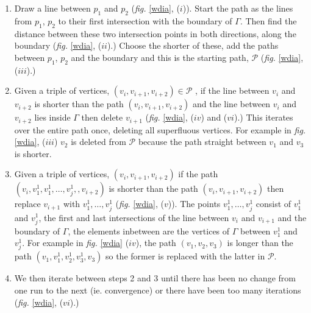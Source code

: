 \documentclass[a4paper,10pt]{article}
\newcommand{\fig}[1]{\emph{fig.} \ref{#1}}
\begin{document}
\begin{enumerate}
\item Draw a line between $p_1$ and $p_2$ (\fig{wdia}, ($i$)). Start the path as the lines from $p_1$, $p_2$ to their first intersection with the boundary of $\Gamma$. Then find the distance between these two intersection points in both directions, along the boundary (\fig{wdia}, ($ii$).) Choose the shorter of these, add the paths between $p_1$, $p_2$ and the boundary and this is the starting path, $\mathcal{P}$ (\fig{wdia}, ($iii$).) 

\item Given a triple of vertices, $(v_i, v_{i+1}, v_{i+2}) \in \mathcal{P}$ , if the line between $v_i$ and $v_{i+2}$ is shorter than the path $(v_i, v_{i+1}, v_{i+2})$ and the line between $v_i$ and $v_{i+2}$ lies inside $\Gamma$ then delete $v_{i+1}$ (\fig{wdia}, ($iv$) and ($vi$).) This iterates over the entire path once, deleting all superfluous vertices. For example in \fig{wdia}, ($iii$) $v_2$ is deleted from $\mathcal{P}$ because the path straight between $v_1$ and $v_3$ is shorter. 

\item Given a triple of vertices, $(v_i, v_{i+1}, v_{i+2})$ if the path $(v_i, v^1_1, v^1_1, \dots, v^1_j,, v_{i+2})$ is shorter than the path $(v_i, v_{i+1}, v_{i+2})$ then replace $v_{i+1}$ with $v^1_1, \dots, v^1_j$ (\fig{wdia}, ($v$)). The points $v^1_1, \dots, v^1_j$ consist of $v^1_1$ and $v^1_j$, the first and last intersections of the line between $v_i$ and $v_{i+1}$ and the boundary of $\Gamma$, the elements inbetween are the vertices of $\Gamma$ between $v^1_1$ and $v^1_j$. For example in \fig{wdia} ($iv$), the path $(v_1, v_2, v_3)$ is longer than the path $(v_1, v^1_1, v^1_2, v^1_3, v_3)$ so the former is replaced with the latter in $\mathcal{P}$.

\item We then iterate between steps 2 and 3 until there has been no change from one run to the next (ie. convergence) or there have been too many iterations (\fig{wdia}, ($vi$).)
\end{enumerate}
\end{document}
